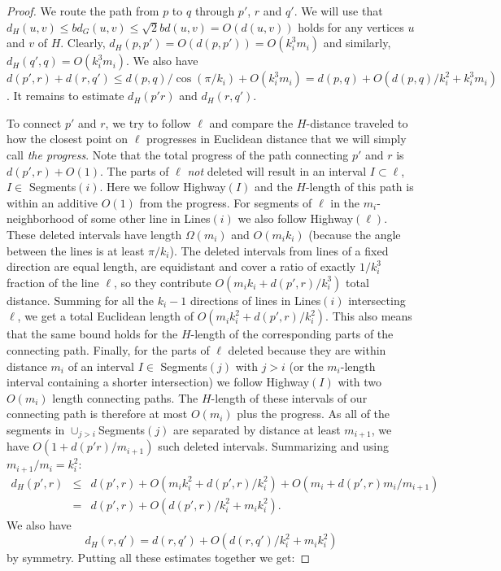 \documentclass[12pt]{article}
\theoremstyle{plain}
\theoremstyle{definition}
\theoremstyle{remark}
\begin{document}
\begin{proof}
We route the path from $p$ to $q$ through $p'$, $r$ and $q'$. We will use that $d_H(u,v)\le bd_G(u,v)\le \sqrt2bd(u,v)=O(d(u,v))$ holds for any vertices $u$ and $v$ of $H$. Clearly, $d_H(p,p')=O(d(p,p'))=O(k_i^3m_i)$ and similarly, $d_H(q',q)=O(k_i^3m_i)$. We also have
$$d(p',r)+d(r,q')\le d(p,q)/\cos(\pi/k_i)+O(k_i^3m_i)=d(p,q)+O(d(p,q)/k_i^2+k_i^3m_i)$$. It remains to estimate $d_H(p'r)$ and $d_H(r,q')$.

To connect $p'$ and $r$, we try to follow $\ell$ and compare the $H$-distance traveled to how the closest point on $\ell$ progresses in Euclidean distance that we will simply call \emph{the progress}. Note that the total progress of the path connecting $p'$ and $r$ is $d(p',r)+O(1)$. The parts of $\ell$ \emph{not} deleted will result in an interval $I\subset\ell$, $I\in$ Segments$(i)$. Here we follow Highway$(I)$ and the $H$-length of this path is within an additive $O(1)$ from the progress. For segments of $\ell$ in the $m_i$-neighborhood of some other line in Lines$(i)$ we also follow Highway$(\ell)$. These deleted intervals have length $\Omega(m_i)$ and $O(m_ik_i)$ (because the angle between the lines is at least $\pi/k_i$). The deleted intervals from lines of a fixed direction are equal length, are equidistant and cover a ratio of exactly $1/k_i^3$ fraction of the line $\ell$, so they contribute $O(m_ik_i+d(p',r)/k_i^3)$ total distance. Summing for all the $k_i-1$ directions of lines in Lines$(i)$ intersecting $\ell$, we get a total Euclidean length of $O(m_ik_i^2+d(p',r)/k_i^2)$. This also means that the same bound holds for the $H$-length of the corresponding parts of the connecting path. Finally, for the parts of $\ell$ deleted because they are within distance $m_i$ of an interval $I\in$ Segments$(j)$ with $j>i$ (or the $m_i$-length interval containing a shorter intersection) we follow Highway$(I)$ with two $O(m_i)$ length connecting paths. The $H$-length of these intervals of our connecting path is therefore at most $O(m_i)$ plus the progress. As all of the segments in $\cup_{j>i}$Segments$(j)$ are separated by distance at least $m_{i+1}$, we have $O(1+d(p'r)/m_{i+1})$ such deleted intervals. Summarizing and using $m_{i+1}/m_i=k_i^2$:
\begin{eqnarray*}
d_H(p',r)&\le&d(p',r)+O(m_ik_i^2+d(p',r)/k_i^2)+O(m_i+d(p',r)m_i/m_{i+1})\\
&=&d(p',r)+O(d(p',r)/k_i^2+m_ik_i^2).
\end{eqnarray*}
We also have
$$d_H(r,q')=d(r,q')+O(d(r,q')/k_i^2+m_ik_i^2)$$
by symmetry. Putting all these estimates together we get:

\end{proof}
\end{document}
